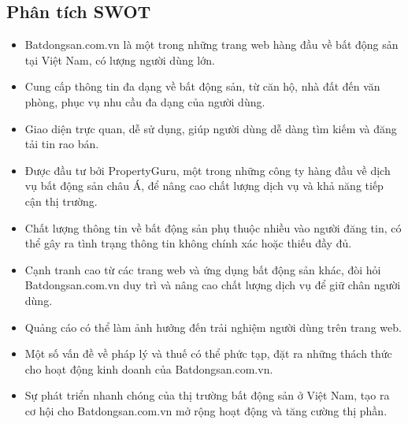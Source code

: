 \subsection{Phân tích SWOT}
\begin{tcbraster}[raster columns=2, boxrule=0mm, arc=0mm]
\begin{tcolorbox}[equal height group=A, size=fbox, colback=swotS!60, colframe=swotS!80!black, title=\textsc{strengths}]
\begin{itemize}
\item Batdongsan.com.vn là một trong những trang web hàng đầu về bất động sản tại Việt Nam, có lượng người dùng lớn.
\item Cung cấp thông tin đa dạng về bất động sản, từ căn hộ, nhà đất đến văn phòng, phục vụ nhu cầu đa dạng của người dùng.
\item Giao diện trực quan, dễ sử dụng, giúp người dùng dễ dàng tìm kiếm và đăng tải tin rao bán.
\item Được đầu tư bởi PropertyGuru, một trong những công ty hàng đầu về dịch vụ bất động sản châu Á, để nâng cao chất lượng dịch vụ và khả năng tiếp cận thị trường.
\end{itemize}
\end{tcolorbox}
\begin{tcolorbox}[equal height group=A, size=fbox, colback=swotW!60, colframe=swotW!80!black, title=\textsc{weaknesses}]
\begin{itemize}
\item Chất lượng thông tin về bất động sản phụ thuộc nhiều vào người đăng tin, có thể gây ra tình trạng thông tin không chính xác hoặc thiếu đầy đủ.
\item Cạnh tranh cao từ các trang web và ứng dụng bất động sản khác, đòi hỏi Batdongsan.com.vn duy trì và nâng cao chất lượng dịch vụ để giữ chân người dùng.
\item Quảng cáo có thể làm ảnh hưởng đến trải nghiệm người dùng trên trang web.
\item Một số vấn đề về pháp lý và thuế có thể phức tạp, đặt ra những thách thức cho hoạt động kinh doanh của Batdongsan.com.vn.
\end{itemize}
\end{tcolorbox}
\begin{tcolorbox}[equal height group=B, size=fbox, colback=swotO!60, colframe=swotO!80!black, title=\textsc{opportunities}]
\begin{itemize}
\item Sự phát triển nhanh chóng của thị trường bất động sản ở Việt Nam, tạo ra cơ hội cho Batdongsan.com.vn mở rộng hoạt động và tăng cường thị phần.

\end{itemize}
\end{tcolorbox}
\end{tcbraster}
